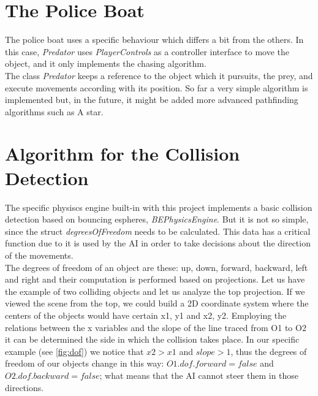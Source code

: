 \documentclass[]{article}
\begin{document}
\section{The Police Boat}

The police boat uses a specific behaviour which differs a bit from the others. In this case, \emph{Predator} uses \emph{PlayerControls} as a controller interface to move the object, and it only
implements the chasing algorithm. \\

The class \emph{Predator} keeps a reference to the object which it pursuits, the prey, and execute movements according with its position. So far a very simple algorithm is implemented but, in the future, 
it might be added more advanced pathfinding algorithms such as A star.


\section{Algorithm for the Collision Detection}

The specific physiscs engine built-in with this project implements a basic collision detection based on bouncing espheres, \emph{BEPhysicsEngine}. But it is not so simple, since the struct \emph{degreesOfFreedom} 
needs to be calculated. This data has a critical function due to it is used by the AI in order to take decisions about the direction of the movements.\\

The degrees of freedom of an object are these: up, down, forward, backward, left and right and their computation is performed based on projections. Let us have the example of two colliding 
  objects and let us analyze the top projection. If we viewed the scene from the top, we could build a 2D coordinate system where the centers of the objects would have certain
  x1, y1 and x2, y2. Employing the relations between the x variables and the slope of the line traced from O1 to O2 it can be determined the side in which the collision takes place. In our
  specific example (see \ref{fig:dof}) we notice that $x2 > x1$ and $slope > 1$, thus the degrees of freedom of our objects change in this way: $O1.dof.forward = false$ and $O2.dof.backward = false$; what means 
  that the AI cannot steer them in those directions.
\end{document}
